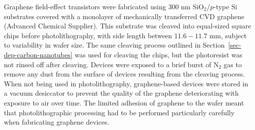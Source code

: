 \documentclass[
  a4paper,
]{scrbook}
\begin{document}
Graphene field-effect transistors were fabricated using 300 nm
SiO\(_2\)/\(p\)-type Si substrates covered with a monolayer of
mechanically transferred CVD graphene (Advanced Chemical Supplier). This
substrate was cleaved into equal-sized square chips before
photolithography, with side length between \(11.6-11.7\) mm, subject to
variability in wafer size. The same cleaving process outlined in
Section~\ref{sec-dep-carbon-nanotubes} was used for cleaving the chips,
but the photoresist was not rinsed off after cleaving. Devices were
exposed to a brief burst of N\(_2\) gas to remove any dust from the
surface of devices resulting from the cleaving process. When not being
used in photolithography, graphene-based devices were stored in a vacuum
desiccator to prevent the quality of the graphene deteriorating with
exposure to air over time. The limited adhesion of graphene to the wafer
meant that photolithographic processing had to be performed particularly
carefully when fabricating graphene devices.
\end{document}

